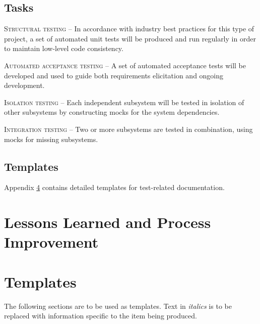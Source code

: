 \documentclass[11pt]{wacomepd}
\begin{document}
\section {Tasks}
\textsc{Structural testing} -- In accordance with industry best practices for this type of project,
a set of automated unit tests will be produced and run regularly in order to maintain low-level code
consistency.

\textsc{Automated acceptance testing} -- A set of automated acceptance tests will be developed and
used to guide both requirements elicitation and ongoing development.

\textsc{Isolation testing} -- Each independent subsystem will be tested in isolation of other
subsystems by constructing mocks for the system dependencies.

\textsc{Integration testing} -- Two or more subsystems are tested in combination, using mocks for
missing subsystems.


\section{Templates}
Appendix \ref{appA} contains detailed templates for test-related documentation.

\chapter{Lessons Learned and Process Improvement}


\clearpage
\appendix
\chapter{Templates}
\label{appA}
The following sections are to be used as templates.  Text in \textit{italics} is to be replaced with
information specific to the item being produced.
\end{document}
